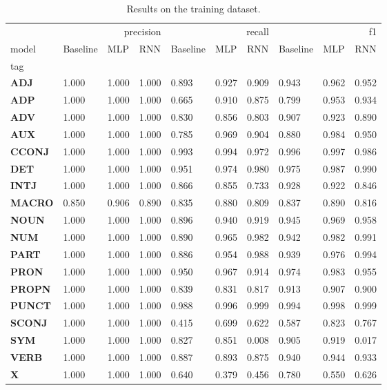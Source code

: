 \begin{table}
\caption{Results on the training dataset.}
\label{tab::ex_2_train}
\begin{tabular}{|l||l||l||l||l||l||l||l||l||l|}
\toprule
 & \multicolumn{3}{r}{precision} & \multicolumn{3}{r}{recall} & \multicolumn{3}{r}{f1} \\
model & Baseline & MLP & RNN & Baseline & MLP & RNN & Baseline & MLP & RNN \\
tag &  &  &  &  &  &  &  &  &  \\
\midrule
\textbf{ADJ} & 1.000 & 1.000 & 1.000 & 0.893 & 0.927 & 0.909 & 0.943 & 0.962 & 0.952 \\
\textbf{ADP} & 1.000 & 1.000 & 1.000 & 0.665 & 0.910 & 0.875 & 0.799 & 0.953 & 0.934 \\
\textbf{ADV} & 1.000 & 1.000 & 1.000 & 0.830 & 0.856 & 0.803 & 0.907 & 0.923 & 0.890 \\
\textbf{AUX} & 1.000 & 1.000 & 1.000 & 0.785 & 0.969 & 0.904 & 0.880 & 0.984 & 0.950 \\
\textbf{CCONJ} & 1.000 & 1.000 & 1.000 & 0.993 & 0.994 & 0.972 & 0.996 & 0.997 & 0.986 \\
\textbf{DET} & 1.000 & 1.000 & 1.000 & 0.951 & 0.974 & 0.980 & 0.975 & 0.987 & 0.990 \\
\textbf{INTJ} & 1.000 & 1.000 & 1.000 & 0.866 & 0.855 & 0.733 & 0.928 & 0.922 & 0.846 \\
\textbf{MACRO} & 0.850 & 0.906 & 0.890 & 0.835 & 0.880 & 0.809 & 0.837 & 0.890 & 0.816 \\
\textbf{NOUN} & 1.000 & 1.000 & 1.000 & 0.896 & 0.940 & 0.919 & 0.945 & 0.969 & 0.958 \\
\textbf{NUM} & 1.000 & 1.000 & 1.000 & 0.890 & 0.965 & 0.982 & 0.942 & 0.982 & 0.991 \\
\textbf{PART} & 1.000 & 1.000 & 1.000 & 0.886 & 0.954 & 0.988 & 0.939 & 0.976 & 0.994 \\
\textbf{PRON} & 1.000 & 1.000 & 1.000 & 0.950 & 0.967 & 0.914 & 0.974 & 0.983 & 0.955 \\
\textbf{PROPN} & 1.000 & 1.000 & 1.000 & 0.839 & 0.831 & 0.817 & 0.913 & 0.907 & 0.900 \\
\textbf{PUNCT} & 1.000 & 1.000 & 1.000 & 0.988 & 0.996 & 0.999 & 0.994 & 0.998 & 0.999 \\
\textbf{SCONJ} & 1.000 & 1.000 & 1.000 & 0.415 & 0.699 & 0.622 & 0.587 & 0.823 & 0.767 \\
\textbf{SYM} & 1.000 & 1.000 & 1.000 & 0.827 & 0.851 & 0.008 & 0.905 & 0.919 & 0.017 \\
\textbf{VERB} & 1.000 & 1.000 & 1.000 & 0.887 & 0.893 & 0.875 & 0.940 & 0.944 & 0.933 \\
\textbf{X} & 1.000 & 1.000 & 1.000 & 0.640 & 0.379 & 0.456 & 0.780 & 0.550 & 0.626 \\
\bottomrule
\end{tabular}
\end{table}
